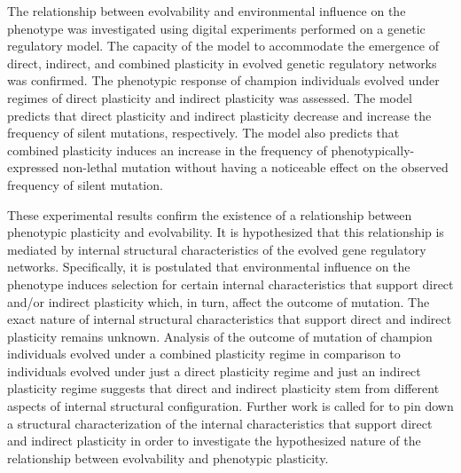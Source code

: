 The relationship between evolvability and environmental influence on the phenotype was investigated using digital experiments performed on a genetic regulatory model.
The capacity of the model to accommodate the emergence of direct, indirect, and combined plasticity in evolved genetic regulatory networks was confirmed.
The phenotypic response of champion individuals evolved under regimes of direct plasticity and indirect plasticity was assessed.
The model predicts that direct plasticity and indirect plasticity decrease and increase the frequency of silent mutations, respectively.
The model also predicts that combined plasticity induces an increase in the frequency of phenotypically-expressed non-lethal mutation without having a noticeable effect on the observed frequency of silent mutation.

These experimental results confirm the existence of a relationship between phenotypic plasticity and evolvability.
It is hypothesized that this relationship is mediated by internal structural characteristics of the evolved gene regulatory networks.
Specifically, it is postulated that environmental influence on the phenotype induces selection for certain internal characteristics that support direct and/or indirect plasticity which, in turn, affect the outcome of mutation.
The exact nature of internal structural characteristics that support direct and indirect plasticity remains unknown.
Analysis of the outcome of mutation of champion individuals evolved under a combined plasticity regime in comparison to individuals evolved under just a direct plasticity regime and just an indirect plasticity regime suggests that direct and indirect plasticity stem from different aspects of internal structural configuration. 
Further work is called for to pin down a structural characterization of the internal characteristics that support direct and indirect plasticity in order to investigate the hypothesized nature of the relationship between evolvability and phenotypic plasticity.